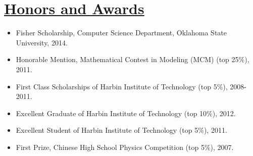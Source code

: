 \documentclass{article}
\newlength{\nL}
\newcommand{\underLineText}[1]{\settowidth{\nL}{#1}\setlength{\nL}{0.8\textwidth-\nL}\underline{{\sc #1}\hspace{\nL}}}
\begin{document}
\section*{\underLineText{Honors and Awards}}
\begin{itemize}
\item Fisher Scholarship, Computer Science Department, Oklahoma State University, 2014.
\item Honorable Mention, Mathematical Contest in Modeling (MCM) (top 25\%), 2011.
\item First Class Scholarships of Harbin Institute of Technology (top 5\%), 2008-2011.
\item Excellent Graduate of Harbin Institute of Technology (top 10\%), 2012.
\item Excellent Student of Harbin Institute of Technology (top 5\%), 2011.
\item First Prize, Chinese High School Physics Competition (top 5\%), 2007.
\end{itemize}
\end{document}
